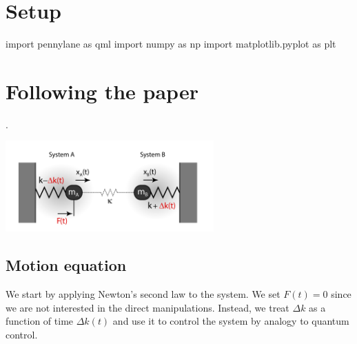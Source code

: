 \newcommand{\dk}[0]{\Delta k(t)}
\newcommand{\K}[0]{\kappa}
\newcommand{\Oc}[0]{\Omega_c}
\newcommand{\Oz}[0]{\Omega_0}
\newcommand{\Od}[0]{\Omega_d(t)}
\newcommand{\xp}[0]{x_+}
\newcommand{\xm}[0]{x_-}
\newcommand{\Op}[0]{\Omega_{+}}
\newcommand{\Om}[0]{\Omega_{-}}
\newcommand{\Opm}[0]{\Omega_{\pm}}
\newcommand{\Omp}[0]{\Omega_{\mp}}
\newcommand{\dO}[0]{\Delta\Omega}
\newcommand{\od}[0]{\omega_d(t)}
\renewcommand{\a}[0]{a(t)}
\renewcommand{\b}[0]{b(t)}
\newcommand{\odr}[0]{\omega_{drive}}
\newcommand{\ar}[0]{\overline{a}(t)}
\newcommand{\br}[0]{\overline{b}(t)}


\section{Setup}


\begin{python}
import pennylane as qml
import numpy as np
import matplotlib.pyplot as plt
\end{python}

\newpage

\section{Following the paper}

.

\begin{center}
  \includegraphics[width=0.6\textwidth]{img/osc.png}
\end{center}

\subsection{Motion equation}

We start by applying Newton's second law to the system. We set \(F(t) = 0\) since we are not
interested in the direct manipulations. Instead, we treat \(\Delta k\) as a function of time $\dk$
and use it to control the system by analogy to quantum control.

